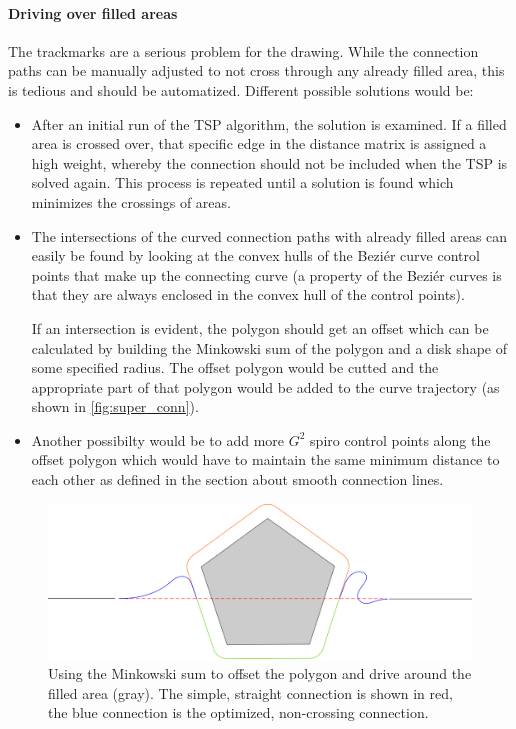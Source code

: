 \paragraph{Driving over filled areas} The trackmarks are a serious problem for the drawing. While the connection paths can be manually adjusted to not cross through any already filled area, this is tedious and should be automatized. Different possible solutions would be:
\begin{itemize}
\item After an initial run of the TSP algorithm, the solution is examined. If a filled area is crossed over, that specific edge in the distance matrix is assigned a high weight, whereby the connection should not be included when the TSP is solved again. This process is repeated until a solution is found which minimizes the crossings of areas.
\item The intersections of the curved connection paths with already filled areas can easily be found by looking at the convex hulls of the Beziér curve control points that make up the connecting curve (a property of the Beziér curves is that they are always enclosed in the convex hull of the control points). 

If an intersection is evident, the polygon should get an offset which can be calculated by building the Minkowski sum of the polygon and a disk shape of some specified radius.  The offset polygon would be cutted and the appropriate part of that polygon would be added to the curve trajectory (as shown in \autoref{fig:super_conn}).
\item Another possibilty would be to add more $G^2$ spiro control points along the offset polygon which would have to maintain the same minimum distance to each other as defined in the section about smooth connection lines.
\end{itemize}

\begin{figure}
\includegraphics[width=\textwidth]{images/conclusion/minkowski_crossing_avoidance.pdf}
\caption{Using the Minkowski sum to offset the polygon and drive around the filled area (gray). The simple, straight connection is shown in red, the blue connection is the optimized, non-crossing connection.}\label{fig:super_conn}
\end{figure}

